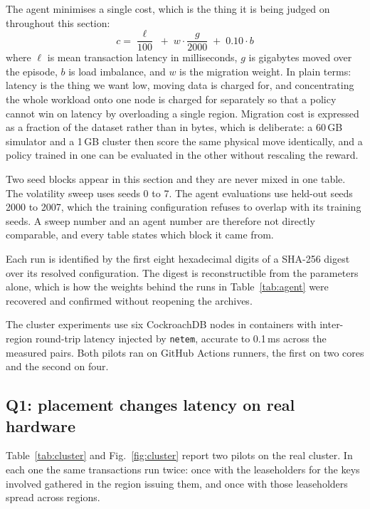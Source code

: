 The agent minimises a single cost, which is the thing it is being judged on
throughout this section:
%
\begin{equation}
c = \frac{\ell}{100} \;+\; w \cdot \frac{g}{2000} \;+\; 0.10 \cdot b
\label{eq:objective}
\end{equation}
%
where $\ell$ is mean transaction latency in milliseconds, $g$ is gigabytes
moved over the episode, $b$ is load imbalance, and $w$ is the migration
weight. In plain terms: latency is the thing we want low, moving data is
charged for, and concentrating the whole workload onto one node is charged
for separately so that a policy cannot win on latency by overloading a
single region. Migration cost is expressed as a fraction of the dataset
rather than in bytes, which is deliberate: a 60\,GB simulator and a 1\,GB
cluster then score the same physical move identically, and a policy trained
in one can be evaluated in the other without rescaling the reward.

Two seed blocks appear in this section and they are never mixed in one
table. The volatility sweep uses seeds 0 to 7. The agent evaluations use
held-out seeds 2000 to 2007, which the training configuration refuses to
overlap with its training seeds. A sweep number and an agent number are
therefore not directly comparable, and every table states which block it
came from.

Each run is identified by the first eight hexadecimal digits of a SHA-256
digest over its resolved configuration. The digest is reconstructible from
the parameters alone, which is how the weights behind the runs in
Table~\ref{tab:agent} were recovered and confirmed without reopening the
archives.

The cluster experiments use six CockroachDB nodes in containers with
inter-region round-trip latency injected by \texttt{netem}, accurate to
0.1\,ms across the measured pairs. Both pilots ran on GitHub Actions
runners, the first on two cores and the second on four.

\subsection{Q1: placement changes latency on real hardware}

Table~\ref{tab:cluster} and Fig.~\ref{fig:cluster} report two pilots on the
real cluster. In each one the same transactions run twice: once with the
leaseholders for the keys involved gathered in the region issuing them, and
once with those leaseholders spread across regions.

